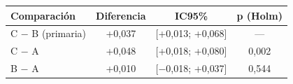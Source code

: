 \begin{tabular}{lccc}
\toprule
Comparación & Diferencia & IC95\% & p (Holm) \\
\midrule
C $-$ B (primaria) & +0{,}037 & [+0{,}013; +0{,}068] & --- \\
C $-$ A & +0{,}048 & [+0{,}018; +0{,}080] & 0{,}002 \\
B $-$ A & +0{,}010 & [$-$0{,}018; +0{,}037] & 0{,}544 \\
\bottomrule
\end{tabular}
